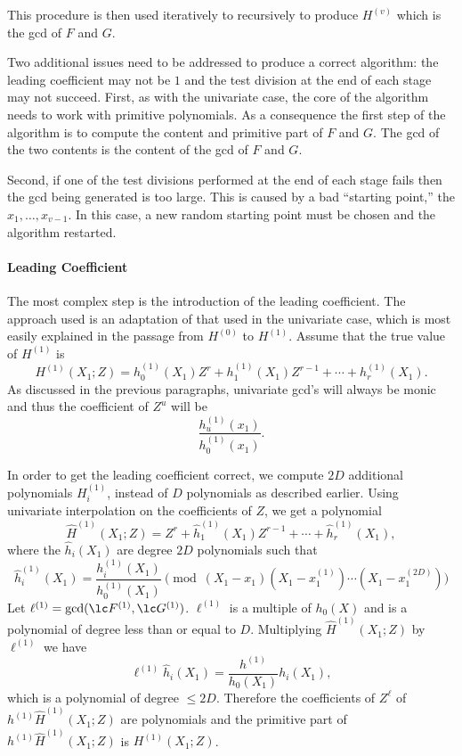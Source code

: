This procedure is then used iteratively to recursively to produce
$H^{(v)}$ which is the {\sc gcd} of $F$ and $G$.

\medskip
Two additional issues need to be addressed to produce a correct
algorithm: the leading coefficient may not be $1$ and the test
division at the end of each stage may not succeed.  First, as with the
univariate case, the core of the algorithm needs to work with
primitive polynomials.  As a consequence the first step of the
algorithm is to compute the content and primitive part of $F$ and $G$.
The {\sc gcd} of the two contents is the content of the {\sc gcd} of
$F$ and $G$.

Second, if one of the test divisions performed at the end of each
stage fails then the {\sc gcd} being generated is too large.  This is
caused by a bad ``starting point,'' the $x_1, \ldots, x_{v-1}$.  In
this case, a new random starting point must be chosen and the algorithm
restarted.  

\paragraph{Leading Coefficient}

The most complex step is the introduction of the leading coefficient.
The approach used is an adaptation of that used in the univariate
case, which is most easily explained in the passage from $H^{(0)}$ to
$H^{(1)}$.  Assume that the true value of $H^{(1)}$ is
\[
H^{(1)}(X_1; Z) = h^{(1)}_0(X_1) Z^r + h^{(1)}_1(X_1) Z^{r-1} + 
  \cdots + h^{(1)}_r(X_1).
\]
As discussed in the previous paragraphs, univariate {\sc gcd}'s will
always be monic and thus the coefficient of $Z^u$ will be
\[
\frac{h^{(1)}_{u}(x_1)}{h^{(1)}_0(x_1)}.
\]

In order to get the leading coefficient correct, we compute $2D$
additional polynomials $H^{(1)}_i$, instead of $D$ polynomials as
described earlier.  Using univariate interpolation on the coefficients
of $Z$, we get a polynomial
\[
\hat{H}^{(1)}(X_1; Z) = Z^r + \hat{h}^{(1)}_1(X_1)Z^{r-1} + \cdots +
\hat{h}^{(1)}_r(X_1),
\]
where the $\hat{h}_i(X_1)$ are degree $2D$ polynomials such that 
\[
\hat{h}^{(1)}_i(X_1) = \frac{h^{(1)}_i(X_1)}{h^{(1)}_0(X_1)} 
  \pmod{(X_1 - x_1)(X_1 - x^{(1)}_1) \cdots (X_1 - x^{(2D)}_1)}
\]
Let $\ell^{(1)} = \gcd(\lc F^{(1)}, \lc G^{(1)})$.  $\ell^{(1)}$ is a
multiple of $h_0(X)$ and is a polynomial of degree less than or equal
to $D$.  Multiplying $\hat{H}^{(1)}(X_1; Z)$ by $\ell^{(1)}$ we have
\[
\ell^{(1)} \hat{h}_i(X_1) = \frac{h^{(1)}}{h_0(X_1)} h_i(X_1),
\]
which is a polynomial of degree $\le 2D$.  Therefore the coefficients
of $Z^{\ell}$ of $h^{(1)} \hat{H}^{(1)}(X_1; Z)$ are polynomials and
the primitive part of $h^{(1)} \hat{H}^{(1)}(X_1; Z)$ is $H^{(1)}(X_1;
Z)$.

